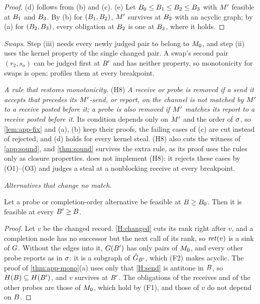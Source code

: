 \begin{proof}
(d) follows from (b) and (c). (e) Let $B_0\le B_1\le B_2\le B_3$ with $M'$ feasible at
$B_1$ and $B_3$. By (b) for $(B_1,B_2)$, $M'$ survives at $B_2$ with an acyclic
graph; by (a) for $(B_2,B_3)$, every obligation at $B_2$ is one at $B_3$, where it holds.
\end{proof}

\emph{Swaps.} Step (iii) needs every newly judged pair to belong to $M_0$, and step (ii) uses
the kernel property of the single changed pair. A swap's second pair $(r_2,s_o)$ can be judged
first at $B'$ and has neither property, so monotonicity for swaps is open; \tool profiles
them at every breakpoint.

\emph{A rule that restores monotonicity.}
(H8) \emph{A receive or probe is removed if a send it accepts that precedes its $M'$-send, or
report, on the channel is not matched by $M'$ to a receive posted before it; a probe is also
removed if $M'$ matches its report to a receive posted before it.} Its condition depends only
on $M'$ and the order of $\sigma$, so \cref{lem:app-fix} and (a), (b) keep their proofs, the
failing cases of (c) are cut instead of rejected, and (d) holds for every kernel steal. (H8)
also cuts the witness of \cref{app:sound}, and \cref{thm:sound} survives the extra rule, as its
proof uses the rules only as closure properties. \tool does not implement (H8): it rejects these
cases by (O1)--(O3) and judges a steal at a nonblocking receive at every breakpoint.

\emph{Alternatives that change no match.}

\begin{lemma}\label{lem:app-nochange}
Let a probe or completion-order alternative be feasible at $B\ge B_0$. Then it is feasible at
every $B'\ge B$.
\end{lemma}

\begin{proof}
Let $v$ be the changed record. \ref{H:changed} cuts its rank right after $v$, and a completion
node has no successor but the next call of its rank, so $\mathit{ret}(v)$ is a sink of $G$.
Without the edges into it, $G(B')$ has only pairs of $M_0$, and every other probe
reports as in $\sigma$: it is a subgraph of $\hat G_{B'}$, which (F2) makes acyclic. The
proof of \cref{thm:app-mono}(a) uses only that \ref{H:send} is antitone in $B$, so
$H(B)\subseteq H(B')$, and $v$ survives at $B'$. The obligations of the receives
and of the other probes are those of $M_0$, which hold by (F1), and those of $v$ do not depend
on $B$.
\end{proof}

